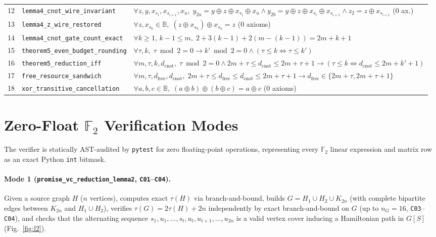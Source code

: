 \documentclass[10pt,twocolumn]{article}
\begin{document}
\begin{table}[t]
\begin{tabular}{@{}rll@{}}
12 & \texttt{lemma4\_cnot\_wire\_invariant} & $\forall z,y,x_{s_i},x_{s_{i+1}},x_u,\; y_{2a}{=}y{\oplus}z{\oplus}x_{s_i}{\oplus}x_u \land y_{2b}{=}y{\oplus}z{\oplus}x_{s_i}{\oplus}x_{s_{i+1}} \land z_2{=}z{\oplus}x_{s_{i+1}}$ (0 ax.) \\
13 & \texttt{lemma4\_z\_wire\_restored} & $\forall z, x_{s_k} \in \mathbb{B},\; (z \oplus x_{s_k}) \oplus x_{s_k} = z$ (0 axioms) \\
14 & \texttt{lemma4\_cnot\_gate\_count\_exact} & $\forall k \ge 1,\, k-1 \le m,\; 2 + 3(k-1) + 2(m-(k-1)) = 2m + k + 1$ \\
15 & \texttt{theorem5\_even\_budget\_rounding} & $\forall \tau,k,\; \tau\bmod 2=0 \to k'\bmod 2=0 \land (\tau\le k \iff \tau\le k')$ \\
16 & \texttt{theorem5\_reduction\_iff} & $\forall m,\tau,k,d_{\mathrm{cnot}},\; \tau\bmod 2=0 \land 2m+\tau \le d_{\mathrm{cnot}} \le 2m+\tau+1 \to (\tau \le k \iff d_{\mathrm{cnot}} \le 2m + k' + 1)$ \\
17 & \texttt{free\_resource\_sandwich} & $\forall m,\tau,d_{\mathrm{free}},d_{\mathrm{cnot}},\; 2m+\tau \le d_{\mathrm{free}} \le d_{\mathrm{cnot}} \le 2m+\tau+1 \to d_{\mathrm{free}} \in \{2m+\tau, 2m+\tau+1\}$ \\
18 & \texttt{xor\_transitive\_cancellation} & $\forall a, b, c \in \mathbb{B},\; (a \oplus b) \oplus (b \oplus c) = a \oplus c$ (0 axioms) \\
\bottomrule
\end{tabular}
\end{table}

\section{Zero-Float \texorpdfstring{$\mathbb{F}_2$}{F2} Verification Modes}
\label{sec:modes}

The verifier  is statically AST-audited by \texttt{pytest} for zero floating-point operations, representing every $\mathbb{F}_2$ linear expression and matrix row as an exact Python \texttt{int} bitmask.

\paragraph{Mode 1 (\texttt{promise\_vc\_reduction\_lemma2}, \texttt{C01}--\texttt{C04}).}
Given a source graph $H$ ($n$ vertices), computes exact $\tau(H)$ via branch-and-bound, builds $G = H_1 \cup H_2 \cup K_{2n}$ (with complete bipartite edges between $K_{2n}$ and $H_1 \cup H_2$), verifies $\tau(G) = 2\tau(H)+2n$ independently by exact branch-and-bound on $G$ (up to $n_G = 16$, \texttt{C03}--\texttt{C04}), and checks that the alternating sequence $s_1, u_1, \dots, s_t, u_t, u_{t+1}, \dots, u_{2n}$ is a valid vertex cover inducing a Hamiltonian path in $G[S]$ (Fig.~\ref{fig:l2}).
\end{document}
